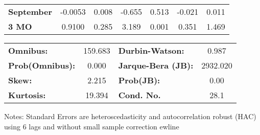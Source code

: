 \begin{center}
\begin{tabular}{lcccccc}
\textbf{September} &      -0.0053  &        0.008     &    -0.655  &         0.513        &       -0.021    &        0.011     \\
\textbf{3 MO}      &       0.9100  &        0.285     &     3.189  &         0.001        &        0.351    &        1.469     \\
\bottomrule
\end{tabular}
\begin{tabular}{lclc}
\textbf{Omnibus:}       & 159.683 & \textbf{  Durbin-Watson:     } &    0.987  \\
\textbf{Prob(Omnibus):} &   0.000 & \textbf{  Jarque-Bera (JB):  } & 2932.020  \\
\textbf{Skew:}          &   2.215 & \textbf{  Prob(JB):          } &     0.00  \\
\textbf{Kurtosis:}      &  19.394 & \textbf{  Cond. No.          } &     28.1  \\
\bottomrule
\end{tabular}
\end{center}

Notes: \newline
 [1] Standard Errors are heteroscedasticity and autocorrelation robust (HAC) using 6 lags and without small sample correction
ewline